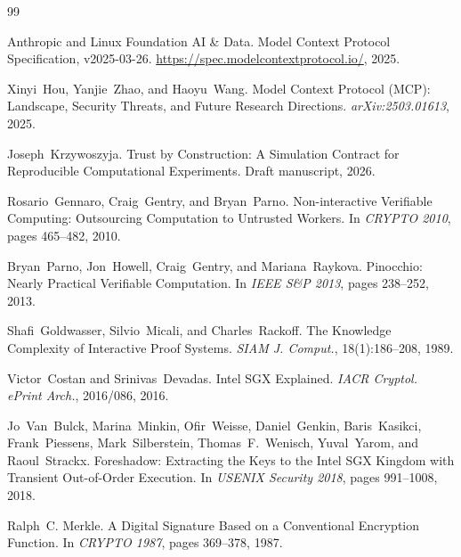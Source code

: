 \documentclass[letterpaper,twocolumn,10pt]{article}
\begin{document}
\iffalse
\begin{thebibliography}{99}

Anthropic and Linux Foundation AI \& Data.
\newblock Model Context Protocol Specification, v2025-03-26.
\newblock \url{https://spec.modelcontextprotocol.io/}, 2025.

Xinyi~Hou, Yanjie~Zhao, and Haoyu~Wang.
\newblock Model Context Protocol (MCP): Landscape, Security Threats, and Future Research Directions.
\newblock \emph{arXiv:2503.01613}, 2025.


Joseph~Krzywoszyja.
\newblock Trust by Construction: A Simulation Contract for Reproducible Computational Experiments.
\newblock Draft manuscript, 2026.

Rosario~Gennaro, Craig~Gentry, and Bryan~Parno.
\newblock Non-interactive Verifiable Computing: Outsourcing Computation to Untrusted Workers.
\newblock In \emph{CRYPTO 2010}, pages 465--482, 2010.

Bryan~Parno, Jon~Howell, Craig~Gentry, and Mariana~Raykova.
\newblock Pinocchio: Nearly Practical Verifiable Computation.
\newblock In \emph{IEEE S\&P 2013}, pages 238--252, 2013.

Shafi~Goldwasser, Silvio~Micali, and Charles~Rackoff.
\newblock The Knowledge Complexity of Interactive Proof Systems.
\newblock \emph{SIAM J. Comput.}, 18(1):186--208, 1989.

Victor~Costan and Srinivas~Devadas.
\newblock Intel SGX Explained.
\newblock \emph{IACR Cryptol. ePrint Arch.}, 2016/086, 2016.

Jo~Van~Bulck, Marina~Minkin, Ofir~Weisse, Daniel~Genkin, Baris~Kasikci, Frank~Piessens, Mark~Silberstein, Thomas~F.~Wenisch, Yuval~Yarom, and Raoul~Strackx.
\newblock Foreshadow: Extracting the Keys to the Intel SGX Kingdom with Transient Out-of-Order Execution.
\newblock In \emph{USENIX Security 2018}, pages 991--1008, 2018.

Ralph~C. Merkle.
\newblock A Digital Signature Based on a Conventional Encryption Function.
\newblock In \emph{CRYPTO 1987}, pages 369--378, 1987.


\end{thebibliography}
\end{document}
